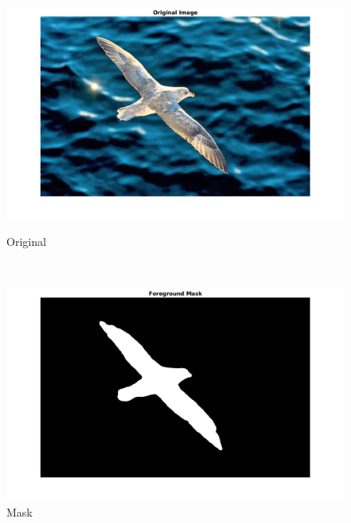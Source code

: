 \documentclass[12pt, a4paper]{article}
\begin{document}
\begin{figure}[h!]
\begin{minipage}[c][1\width]{0.3\textwidth}
    	\hspace*{-0.5in}
    	\includegraphics[width=1.44\textwidth]{bird_original.png}
    	\null\vspace*{-28pt}
    	\caption{Original}
	    \label{fig:3.2(a)}
    \end{minipage} \\
    \renewcommand{\thefigure}{3.2(b)}
    \begin{minipage}[c][1\width]{0.3\textwidth}
    	\hspace*{-1in}
    	\includegraphics[width=1.5\textwidth]{bird_mask.png}
    	\null\vspace*{-28pt}
    	\caption{Mask}
	    \label{fig:3.2(b)}
    \end{minipage}
    \renewcommand{\thefigure}{3.2(c)}
    \begin{minipage}[c][1\width]{0.3\textwidth}
    	\hspace*{-0.5in}

\end{minipage}
\end{figure}
\end{document}
